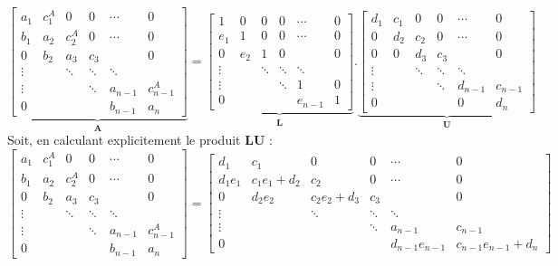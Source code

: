 \documentclass[12pt]{report}
\begin{document}
\begin{equation*}\underbrace{
\begin{bmatrix}
a_1 & c_1^A & 0 & 0 & \cdots & 0 \\ 
b_1 & a_2 & c_2^A & 0 & \cdots & 0 \\
0 & b_2 & a_3 & c_3 & ~ & 0 \\
\vdots & ~ & \ddots & \ddots & \ddots & ~ \\
\vdots & ~ & ~ & \ddots & a_{n-1} & c_{n-1}^A \\ 
0 & ~ & ~ & ~ & b_{n-1} & a_n
\end{bmatrix}}_{\mathbf{A}} = \underbrace{\begin{bmatrix}
1 & 0 & 0 & 0 & \cdots & 0 \\ 
e_1 & 1 & 0 & 0 & \cdots & 0 \\
0 & e_2 & 1 &0 & ~ & 0 \\
\vdots & ~ & \ddots & \ddots & \ddots & ~ \\
\vdots & ~ & ~ & \ddots & 1 & 0 \\ 
0 & ~ & ~ & ~ & e_{n-1} &1
\end{bmatrix}}_{\mathbf{L}}.\underbrace{\begin{bmatrix}
d_1 & c_1 & 0 & 0 & \cdots & 0 \\ 
0 & d_2 & c_2 & 0 & \cdots & 0 \\
0 & 0 & d_3 & c_3 & ~ & 0 \\
\vdots & ~ & \ddots & \ddots & \ddots & ~ \\
\vdots & ~ & ~ & \ddots & d_{n-1} & c_{n-1} \\ 
0 & ~ & ~ & ~ & 0 & d_n
\end{bmatrix}}_{\mathbf{U}}
\end{equation*}
Soit, en calculant explicitement le produit $\mathbf{L} \mathbf{U}$ : 
\begin{equation*}
\begin{bmatrix}
a_1 & c_1^A & 0 & 0 & \cdots & 0 \\ 
b_1 & a_2 & c_2^A & 0 & \cdots & 0 \\
0 & b_2 & a_3 & c_3 & ~ & 0 \\
\vdots & ~ & \ddots & \ddots & \ddots & ~ \\
\vdots & ~ & ~ & \ddots & a_{n-1} & c_{n-1}^A \\ 
0 & ~ & ~ & ~ & b_{n-1} & a_n
\end{bmatrix} = \begin{bmatrix}
d_1 & c_1 & 0 & 0 & \cdots & 0 \\ 
d_1 e_1 & c_1 e_1 + d_2& c_2 & 0 & \cdots & 0 \\
0 & d_2 e_2 & c_2 e_2 + d_3 & c_3 & ~ & 0 \\
\vdots & ~ & \ddots & \ddots & \ddots & ~ \\
\vdots & ~ & ~ & \ddots & a_{n-1} & c_{n-1} \\ 
0 & ~ & ~ & ~ & d_{n-1} e_{n-1} & c_{n-1} e_{n-1} +d_n
\end{bmatrix}
\end{equation*}
\end{document}
